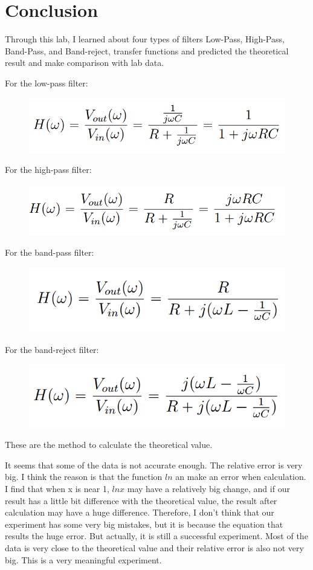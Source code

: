 \documentclass{article}
\begin{document}
\section{Conclusion}
Through this lab, I  learned about four types of filters Low-Pass, High-Pass, Band-Pass, and Band-reject, transfer functions
and predicted the theoretical result and make comparison with lab data.

For the low-pass filter:
\begin{figure}[H]
	\centering
	\includegraphics[width=0.3\linewidth]{pic1}
	\label{fig:pic1}
\end{figure}

For the high-pass filter:
\begin{figure}[H]
	\centering
	\includegraphics[width=0.3\linewidth]{pic2}
	\label{fig:pic2}
\end{figure}

For the band-pass filter:
\begin{figure}[H]
	\centering
	\includegraphics[width=0.3\linewidth]{pic3}
	\label{fig:pic3}
\end{figure}

For the band-reject filter:
\begin{figure}[H]
	\centering
	\includegraphics[width=0.3\linewidth]{pic4}
	\label{fig:pic4}
\end{figure}

These are the method to calculate the theoretical value.


It seems that some of the data is not accurate enough. The relative error is very big. I think the reason is that the function $ln$ an make an error when calculation. I find that when x is near 1, $ln x$ may have a relatively big change, and if our result has a little bit difference with the theoretical value, the result after calculation may have a huge difference. Therefore, I don't think that our experiment has some very big mistakes, but it is because the equation that results the huge error. But actually, it is still a successful experiment. Most of the data is very close to the theoretical value and their relative error is also not very big. This is a very meaningful experiment.
\end{document}
